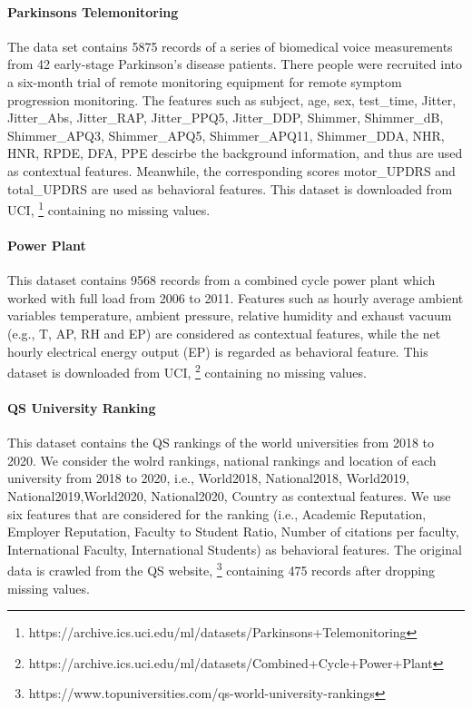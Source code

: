 \documentclass[pdflatex,sn-basic]{sn-jnl}%
\theoremstyle{thmstyleone}%
\theoremstyle{thmstyletwo}%
\theoremstyle{thmstylethree}%
\begin{document}
\begin{appendices}
\paragraph{Parkinsons Telemonitoring} The data set contains 5875 records of a series of biomedical voice measurements from 42 early-stage Parkinson's disease patients. There people were recruited into a six-month trial of remote monitoring equipment for remote symptom progression monitoring. The features such as subject, age, sex, test\_time, Jitter, Jitter\_Abs, Jitter\_RAP, Jitter\_PPQ5, Jitter\_DDP, Shimmer, Shimmer\_dB, Shimmer\_APQ3, Shimmer\_APQ5, Shimmer\_APQ11, Shimmer\_DDA, NHR, HNR, RPDE, DFA, PPE descirbe the background information, and thus are used as contextual features. Meanwhile, the corresponding scores motor\_UPDRS and total\_UPDRS are used as behavioral features. This dataset is downloaded from UCI, \footnote{https://archive.ics.uci.edu/ml/datasets/Parkinsons+Telemonitoring} containing no missing values.

\paragraph{Power Plant} This dataset contains 9568 records from a combined cycle power plant which worked with full load from 2006 to 2011. Features such as hourly average ambient variables temperature, ambient pressure, relative humidity and exhaust vacuum (e.g., T, AP, RH and EP) are considered as contextual features, while the net hourly electrical energy output (EP) is regarded as behavioral feature. This dataset is downloaded from UCI, \footnote{https://archive.ics.uci.edu/ml/datasets/Combined+Cycle+Power+Plant} containing no missing values.

\paragraph{QS University Ranking} This dataset contains the QS rankings of the world universities from 2018 to 2020. We consider the wolrd rankings, national rankings and location of each university from 2018 to 2020, i.e., World2018, National2018, World2019, National2019,World2020, National2020, Country as contextual features. We use six features that are considered for the ranking (i.e., Academic Reputation, Employer Reputation, Faculty to Student Ratio, Number of citations per faculty, International Faculty, International Students) as behavioral features. The original data is crawled from the QS website, \footnote{https://www.topuniversities.com/qs-world-university-rankings} containing 475 records after dropping missing values.


\end{appendices}
\end{document}
